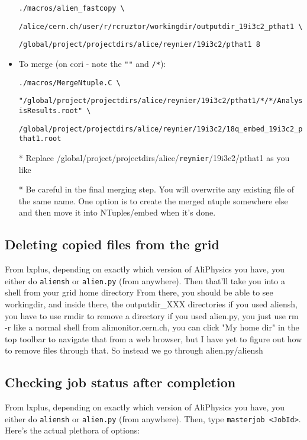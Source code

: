 \documentclass[12pt]{article}
\begin{document}
\begin{itemize}
\verb|./macros/alien_fastcopy \|

\verb|/alice/cern.ch/user/r/|\color{olive}\verb|rcruztor|\color{black}\verb|/workingdir/outputdir_19i3c2_pthat1 \|

\verb|/global/project/projectdirs/alice/|\color{olive}\verb|reynier|\color{black}\verb|/19i3c2/pthat1 8|

\item To merge (on cori - note the \verb|""| and \verb|/*|):

\verb|./macros/MergeNtuple.C \|

\verb|"/global/project/projectdirs/alice/|\color{olive}\verb|reynier|\color{black}\verb|/19i3c2/pthat1/*/*/AnalysisResults.root" \|

\verb|/global/project/projectdirs/alice/|\color{olive}\verb|reynier|\color{black}\verb|/19i3c2/18q_embed_19i3c2_pthat1.root|

* Replace /global/project/projectdirs/alice/\color{olive}\verb|reynier|\color{black}/19i3c2/pthat1 as you like

* Be careful in the final merging step. You will overwrite any existing file of the same name. One option is to create the merged ntuple somewhere else and then move it into NTuples/embed when it's done.
\end{itemize}

\subsection{Deleting copied files from the grid}

From lxplus, depending on exactly which version of AliPhysics you have, you either do \verb|aliensh| or \verb|alien.py| (from anywhere).
Then that'll take you into a shell from your grid home directory
From there, you should be able to see workingdir, and inside there, the outputdir\_XXX directories
if you used aliensh, you have to use rmdir to remove a directory
if you used alien.py, you just use rm -r like a normal shell
from alimonitor.cern.ch, you can click "My home dir" in the top toolbar to navigate that from a web browser, but I have yet to figure out how to remove files through that. So instead we go through alien.py/aliensh

\subsection{Checking job status after completion}
From lxplus, depending on exactly which version of AliPhysics you have, you either do \verb|aliensh| or \verb|alien.py| (from anywhere).
Then, type \verb|masterjob <JobId>|.
Here's the actual plethora of options:
\end{document}
